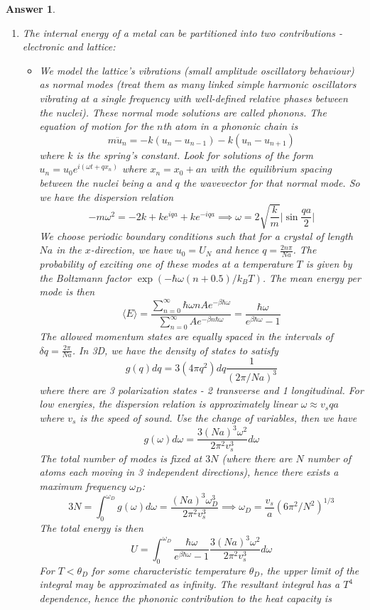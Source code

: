 \documentclass[a4paper]{article}
\newtheorem{ans}{Answer}[subsection]
\theoremstyle{new}
\begin{document}
\begin{ans}\leavevmode
\begin{enumerate}[label=(\roman*)]
\item The internal energy of a metal can be partitioned into two contributions - electronic and lattice:
\begin{itemize}
    \item We model the lattice's vibrations (small amplitude oscillatory behaviour) as normal modes (treat them as many linked simple harmonic oscillators vibrating at a single frequency with well-defined relative phases between the nuclei). These normal mode solutions are called phonons. The equation of motion for the $n$th atom in a phononic chain is
    $$m\ddot{u}_n=-k(u_n-u_{n-1})-k(u_n-u_{n+1})$$
    where $k$ is the spring's constant. Look for solutions of the form $u_n=u_0e^{i(\omega t+qx_n)}$ where $x_n=x_0+an$ with the equilibrium spacing between the nuclei being $a$ and $q$ the wavevector for that normal mode. So we have the dispersion relation
    $$-m\omega^2=-2k+ke^{iqa}+ke^{-iqa}\implies\omega=2\sqrt{\frac{k}{m}}\bigg|\sin\frac{qa}{2}\bigg|$$
    We choose periodic boundary conditions such that for a crystal of length $Na$ in the $x$-direction, we have $u_0=U_N$ and hence $q=\frac{2n\pi}{Na}$. The probability of exciting one of these modes at a temperature $T$ is given by the Boltzmann factor $\exp(-\hbar\omega(n+0.5)/k_BT)$. The mean energy per mode is then
    $$\langle E\rangle=\frac{\sum_{n=0}^\infty\hbar\omega nAe^{-\beta\hbar\omega}}{\sum_{n=0}^\infty Ae^{-\beta n\hbar\omega}}=\frac{\hbar\omega}{e^{\beta\hbar\omega}-1}$$
    The allowed momentum states are equally spaced in the intervals of $\delta q=\frac{2\pi}{Na}$. In 3D, we have the density of states to satisfy
    $$g(q)dq=3(4\pi q^2)dq\frac{1}{(2\pi/Na)^3}$$
    where there are 3 polarization states - 2 transverse and 1 longitudinal. For low energies, the dispersion relation is approximately linear $\omega\approx v_sqa$ where $v_s$ is the speed of sound. Use the change of variables, then we have
    $$g(\omega)d\omega=\frac{3(Na)^3\omega^2}{2\pi^2v_s^3}d\omega$$
    The total number of modes is fixed at $3N$ (where there are $N$ number of atoms each moving in 3 independent directions), hence there exists a maximum frequency $\omega_D$:
    $$3N=\int_0^{\omega_D}g(\omega)d\omega=\frac{(Na)^3\omega_D^3}{2\pi^2v_s^3}\implies\omega_D=\frac{v_s}{a}(6\pi^2/N^2)^{1/3}$$
    The total energy is then
    $$U=\int_0^{\omega_D}\frac{\hbar\omega}{e^{\beta\hbar\omega}-1}\frac{3(Na)^3\omega^2}{2\pi^2v_s^3}d\omega$$
    For $T<\theta_D$ for some characteristic temperature $\theta_D$, the upper limit of the integral may be approximated as infinity. The resultant integral has a $T^4$ dependence, hence the phononic contribution to the heat capacity is

\end{itemize}
\end{enumerate}
\end{ans}
\end{document}
